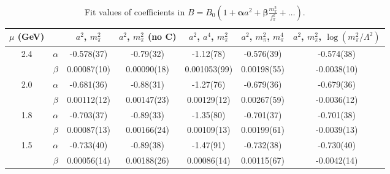 \documentclass[12pt]{extarticle}
\begin{document}
\begin{table}[h!]
\begin{center}
\begin{tabular}{|c c|c|c|c|c|c|}
\hline
$\mu$ (GeV) &  & $a^2$, $m_\pi^2$& $a^2$, $m_\pi^2$ (no C)& $a^2$, $a^4$, $m_\pi^2$& $a^2$, $m_\pi^2$, $m_\pi^4$& $a^2$, $m_\pi^2$, $\log(m_\pi^2/\Lambda^2)$\\
\hline
\multirow{2}{0.5in}{2.4} & $\alpha$ & -0.578(37)& -0.79(32)& -1.12(78)& -0.576(39)& -0.574(38)\\
 & $\beta$ & 0.00087(10)& 0.00090(18)& 0.001053(99)& 0.00198(55)& -0.0038(10)\\
\hline
\multirow{2}{0.5in}{2.0} & $\alpha$ & -0.681(36)& -0.88(31)& -1.27(76)& -0.679(36)& -0.679(36)\\
 & $\beta$ & 0.00112(12)& 0.00147(23)& 0.00129(12)& 0.00267(59)& -0.0036(12)\\
\hline
\multirow{2}{0.5in}{1.8} & $\alpha$ & -0.703(37)& -0.89(33)& -1.35(80)& -0.701(37)& -0.701(38)\\
 & $\beta$ & 0.00087(13)& 0.00166(24)& 0.00109(13)& 0.00199(61)& -0.0039(13)\\
\hline
\multirow{2}{0.5in}{1.5} & $\alpha$ & -0.733(40)& -0.89(38)& -1.47(91)& -0.732(38)& -0.730(40)\\
 & $\beta$ & 0.00056(14)& 0.00188(26)& 0.00086(14)& 0.00115(67)& -0.0042(14)\\
\hline
\end{tabular}
\caption{Fit values of coefficients in $B = B_0(1 + \mathbf{\alpha} a^2 + \mathbf{\beta} \frac{m_\pi^2}{f_\pi^2} + \ldots)$.}
\end{center}
\end{table}




















\clearpage
\end{document}
